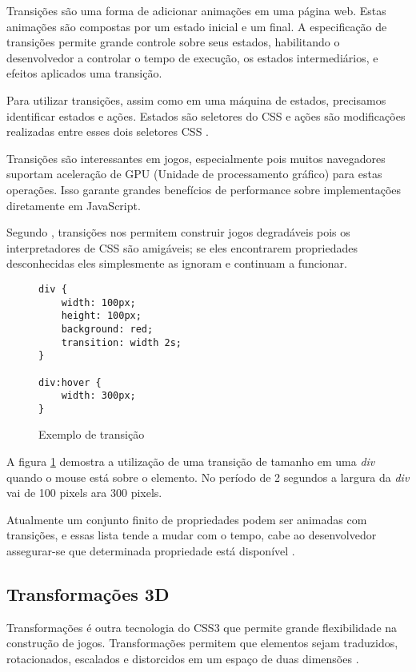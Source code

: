 Transições são uma forma de adicionar animações em uma página
web. Estas animações são compostas por um estado inicial e um final.
A especificação de transições permite grande controle sobre seus
estados, habilitando o desenvolvedor a controlar o tempo de execução,
os estados intermediários, e efeitos aplicados uma transição.

Para utilizar transições, assim como em uma máquina de estados,
precisamos identificar estados e ações. Estados são seletores do CSS
e ações são modificações realizadas entre esses dois seletores CSS
\autocite{html5mostwanted}.

Transições são interessantes em jogos, especialmente pois muitos
navegadores suportam aceleração de GPU (Unidade de processamento
gráfico) para estas operações. Isso garante grandes benefícios de
performance sobre implementações diretamente em JavaScript.

Segundo \citet{html5mostwanted}, transições nos permitem construir jogos
degradáveis pois os interpretadores de CSS são amigáveis; se eles
encontrarem propriedades desconhecidas eles simplesmente as ignoram e
continuam a funcionar.

\begin{figure}[H]
\centering
\begin{verbatim}
div {
    width: 100px;
    height: 100px;
    background: red;
    transition: width 2s;
}

div:hover {
    width: 300px;
}

\end{verbatim}
\caption{Exemplo de transição}
\label{fig:CSSTransition}
\end{figure}

A figura \ref{fig:CSSTransition} demostra a utilização de uma
transição de tamanho em uma \textit{div} quando o mouse está sobre o
elemento. No período de 2 segundos a largura da \textit{div} vai de 100
pixels ara 300 pixels.

Atualmente um conjunto finito de propriedades podem ser animadas
com transições, e essas lista tende a mudar com o tempo, cabe ao
desenvolvedor assegurar-se que determinada propriedade está disponível
\autocite{mdnTransitions}.

\subsection{Transformações 3D}

Transformações é outra tecnologia do CSS3 que permite grande
flexibilidade na construção de jogos. Transformações permitem que
elementos sejam traduzidos, rotacionados, escalados e distorcidos em um
espaço de duas dimensões \autocite{html5mostwanted}.

